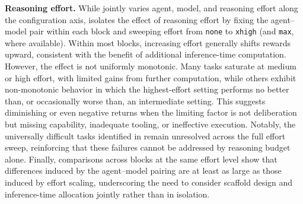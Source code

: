 \documentclass{llmxive}
\begin{document}
\noindent\textbf{Reasoning effort.}
While  jointly varies agent, model, and reasoning effort along the configuration axis,  isolates the effect of reasoning effort by fixing the agent--model pair within each block and sweeping effort from \texttt{none} to \texttt{xhigh} (and \texttt{max}, where available). Within most blocks, increasing effort generally shifts rewards upward, consistent with the benefit of additional inference-time computation. However, the effect is not uniformly monotonic. Many tasks saturate at medium or high effort, with limited gains from further computation, while others exhibit non-monotonic behavior in which the highest-effort setting performs no better than, or occasionally worse than, an intermediate setting. This suggests diminishing or even negative returns when the limiting factor is not deliberation but missing capability, inadequate tooling, or ineffective execution. Notably, the universally difficult tasks identified in  remain unresolved across the full effort sweep, reinforcing that these failures cannot be addressed by reasoning budget alone. Finally, comparisons across blocks at the same effort level show that differences induced by the agent--model pairing are at least as large as those induced by effort scaling, underscoring the need to consider scaffold design and inference-time allocation jointly rather than in isolation.
\end{document}
